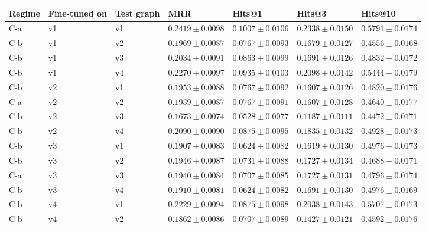 \begin{table}[htbp]
\centering
\small
\renewcommand{\arraystretch}{1.15}
\setlength{\tabcolsep}{5pt}
\begin{adjustbox}{max width=\linewidth}
\begin{tabular}{|l|l|l|l|l|l|l|}
\hline
\textbf{Regime} & \textbf{Fine-tuned on} & \textbf{Test graph} & \textbf{MRR} & \textbf{Hits@1} & \textbf{Hits@3} & \textbf{Hits@10} \\
\hline
C-a & v1 & v1 & $0.2419 \pm 0.0098$ & $0.1007 \pm 0.0106$ & $0.2338 \pm 0.0150$ & $0.5791 \pm 0.0174$ \\
\hline
C-b & v1 & v2 & $0.1969 \pm 0.0087$ & $0.0767 \pm 0.0093$ & $0.1679 \pm 0.0127$ & $0.4556 \pm 0.0168$ \\
\hline
C-b & v1 & v3 & $0.2034 \pm 0.0091$ & $0.0863 \pm 0.0099$ & $0.1691 \pm 0.0126$ & $0.4832 \pm 0.0172$ \\
\hline
C-b & v1 & v4 & $0.2270 \pm 0.0097$ & $0.0935 \pm 0.0103$ & $0.2098 \pm 0.0142$ & $0.5444 \pm 0.0179$ \\
\hline
C-b & v2 & v1 & $0.1953 \pm 0.0088$ & $0.0767 \pm 0.0092$ & $0.1607 \pm 0.0126$ & $0.4820 \pm 0.0176$ \\
\hline
C-a & v2 & v2 & $0.1939 \pm 0.0087$ & $0.0767 \pm 0.0091$ & $0.1607 \pm 0.0128$ & $0.4640 \pm 0.0177$ \\
\hline
C-b & v2 & v3 & $0.1673 \pm 0.0074$ & $0.0528 \pm 0.0077$ & $0.1187 \pm 0.0111$ & $0.4472 \pm 0.0171$ \\
\hline
C-b & v2 & v4 & $0.2090 \pm 0.0090$ & $0.0875 \pm 0.0095$ & $0.1835 \pm 0.0132$ & $0.4928 \pm 0.0173$ \\
\hline
C-b & v3 & v1 & $0.1907 \pm 0.0083$ & $0.0624 \pm 0.0082$ & $0.1619 \pm 0.0130$ & $0.4976 \pm 0.0173$ \\
\hline
C-b & v3 & v2 & $0.1946 \pm 0.0087$ & $0.0731 \pm 0.0088$ & $0.1727 \pm 0.0134$ & $0.4688 \pm 0.0171$ \\
\hline
C-a & v3 & v3 & $0.1940 \pm 0.0084$ & $0.0707 \pm 0.0085$ & $0.1727 \pm 0.0131$ & $0.4796 \pm 0.0174$ \\
\hline
C-b & v3 & v4 & $0.1910 \pm 0.0081$ & $0.0624 \pm 0.0082$ & $0.1691 \pm 0.0130$ & $0.4976 \pm 0.0169$ \\
\hline
C-b & v4 & v1 & $0.2229 \pm 0.0094$ & $0.0875 \pm 0.0098$ & $0.2038 \pm 0.0143$ & $0.5707 \pm 0.0173$ \\
\hline
C-b & v4 & v2 & $0.1862 \pm 0.0086$ & $0.0707 \pm 0.0089$ & $0.1427 \pm 0.0121$ & $0.4592 \pm 0.0176$ \\

\end{tabular}
\end{adjustbox}
\end{table}
